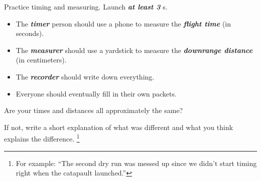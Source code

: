 Practice timing and measuring. 
Launch {\bfseries\itshape at least 3} \mymm{}s. 
\begin{itemize}[nosep]
    \item The {\bfseries\itshape timer} person should use a phone to measure 
        the {\bfseries\itshape flight time} (in seconds).
    \item The {\bfseries\itshape measurer} should use a yardstick to measure 
        the {\bfseries\itshape downrange distance} (in centimeters).
    \item The {\bfseries\itshape recorder} should write down everything.
    \item Everyone should eventually fill in their own packets.
\end{itemize}


Are your times and distances all approximately the same? 

If not, write a short explanation of what was different and 
what you think explains the difference.%
\footnote{%
    For example:%
    ``The second dry run was messed up since we didn't 
    start timing right when the catapault launched.''
}

\myCenteredBox[colback=\myFillinColor]{
    \vspace{1em}
    \underline{\hspace{\textwidth}}\\[0.5\baselineskip]
    \underline{\hspace{\textwidth}}\\[0.5\baselineskip]
    \underline{\hspace{\textwidth}}\\[0.5\baselineskip]
    \underline{\hspace{\textwidth}}\\[0.5\baselineskip]
    \underline{\hspace{\textwidth}}\\[0.5\baselineskip]
    \underline{\hspace{\textwidth}}\\
}
